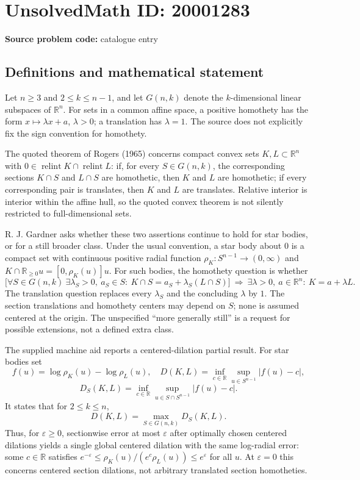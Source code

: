 \documentclass[11pt]{article}
\newcommand{\R}{\mathbb{R}}
\begin{document}
\section*{UnsolvedMath ID: 20001283}
\textbf{Source problem code:} catalogue entry
\subsection{Definitions and mathematical statement}
Let $n\geq3$ and $2\leq k\leq n-1$, and let $G(n,k)$ denote the $k$-dimensional linear subspaces of $\R^n$. For sets in a common affine space, a positive homothety has the form $x\mapsto\lambda x+a$, $\lambda>0$; a translation has $\lambda=1$. The source does not explicitly fix the sign convention for homothety.

The quoted theorem of Rogers (1965) concerns compact convex sets $K,L\subset\R^n$ with $0\in\operatorname{relint}K\cap\operatorname{relint}L$: if, for every $S\in G(n,k)$, the corresponding sections $K\cap S$ and $L\cap S$ are homothetic, then $K$ and $L$ are homothetic; if every corresponding pair is translates, then $K$ and $L$ are translates. Relative interior is interior within the affine hull, so the quoted convex theorem is not silently restricted to full-dimensional sets.

R. J. Gardner asks whether these two assertions continue to hold for star bodies, or for a still broader class. Under the usual convention, a star body about $0$ is a compact set with continuous positive radial function $\rho_K:S^{n-1}\to(0,\infty)$ and $K\cap\R_{\geq0}u=[0,\rho_K(u)]u$. For such bodies, the homothety question is whether
\[
 \bigl[\forall S\in G(n,k)\ \exists\lambda_S>0,\ a_S\in S:\
 K\cap S=a_S+\lambda_S(L\cap S)\bigr]
 \ \Longrightarrow\ \exists\lambda>0,\ a\in\R^n:\ K=a+\lambda L.
\]
The translation question replaces every $\lambda_S$ and the concluding $\lambda$ by $1$. The section translations and homothety centers may depend on $S$; none is assumed centered at the origin. The unspecified ``more generally still'' is a request for possible extensions, not a defined extra class.

The supplied machine aid reports a centered-dilation partial result. For star bodies set
\[
 f(u)=\log\rho_K(u)-\log\rho_L(u),\quad
 D(K,L)=\inf_{c\in\R}\sup_{u\in S^{n-1}}|f(u)-c|,
\]
\[
 D_S(K,L)=\inf_{c\in\R}\sup_{u\in S\cap S^{n-1}}|f(u)-c|.
\]
It states that for $2\leq k\leq n$,
\[
 D(K,L)=\max_{S\in G(n,k)}D_S(K,L).
\]
Thus, for $\varepsilon\geq0$, sectionwise error at most $\varepsilon$ after optimally chosen centered dilations yields a single global centered dilation with the same log-radial error: some $c\in\R$ satisfies $e^{-\varepsilon}\leq\rho_K(u)/(e^c\rho_L(u))\leq e^{\varepsilon}$ for all $u$. At $\varepsilon=0$ this concerns centered section dilations, not arbitrary translated section homotheties.
\end{document}
